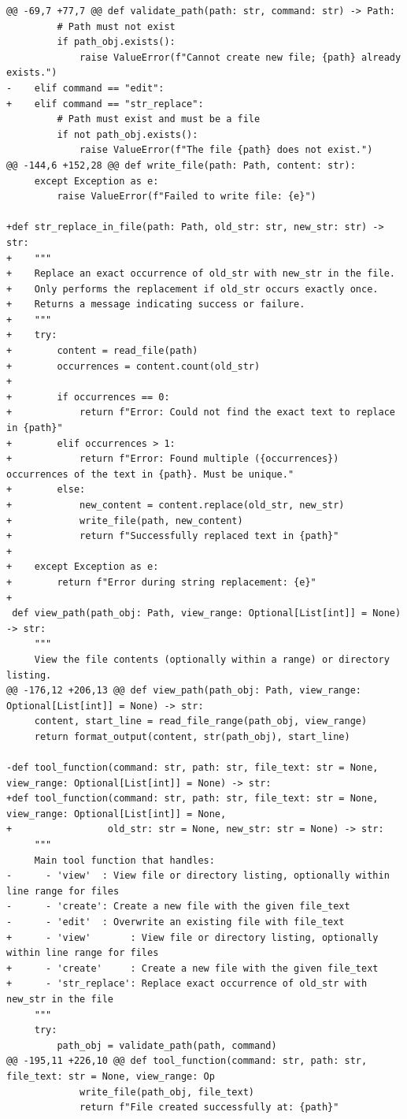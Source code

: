 \documentclass{article} %
\begin{document}
\begin{lstlisting}[style=diffstyle]
@@ -69,7 +77,7 @@ def validate_path(path: str, command: str) -> Path:
         # Path must not exist
         if path_obj.exists():
             raise ValueError(f"Cannot create new file; {path} already exists.")
-    elif command == "edit":
+    elif command == "str_replace":
         # Path must exist and must be a file
         if not path_obj.exists():
             raise ValueError(f"The file {path} does not exist.")
@@ -144,6 +152,28 @@ def write_file(path: Path, content: str):
     except Exception as e:
         raise ValueError(f"Failed to write file: {e}")
 
+def str_replace_in_file(path: Path, old_str: str, new_str: str) -> str:
+    """
+    Replace an exact occurrence of old_str with new_str in the file.
+    Only performs the replacement if old_str occurs exactly once.
+    Returns a message indicating success or failure.
+    """
+    try:
+        content = read_file(path)
+        occurrences = content.count(old_str)
+        
+        if occurrences == 0:
+            return f"Error: Could not find the exact text to replace in {path}"
+        elif occurrences > 1:
+            return f"Error: Found multiple ({occurrences}) occurrences of the text in {path}. Must be unique."
+        else:
+            new_content = content.replace(old_str, new_str)
+            write_file(path, new_content)
+            return f"Successfully replaced text in {path}"
+            
+    except Exception as e:
+        return f"Error during string replacement: {e}"
+
 def view_path(path_obj: Path, view_range: Optional[List[int]] = None) -> str:
     """
     View the file contents (optionally within a range) or directory listing.
@@ -176,12 +206,13 @@ def view_path(path_obj: Path, view_range: Optional[List[int]] = None) -> str:
     content, start_line = read_file_range(path_obj, view_range)
     return format_output(content, str(path_obj), start_line)
 
-def tool_function(command: str, path: str, file_text: str = None, view_range: Optional[List[int]] = None) -> str:
+def tool_function(command: str, path: str, file_text: str = None, view_range: Optional[List[int]] = None,
+                 old_str: str = None, new_str: str = None) -> str:
     """
     Main tool function that handles:
-      - 'view'  : View file or directory listing, optionally within line range for files
-      - 'create': Create a new file with the given file_text
-      - 'edit'  : Overwrite an existing file with file_text
+      - 'view'       : View file or directory listing, optionally within line range for files
+      - 'create'     : Create a new file with the given file_text
+      - 'str_replace': Replace exact occurrence of old_str with new_str in the file
     """
     try:
         path_obj = validate_path(path, command)
@@ -195,11 +226,10 @@ def tool_function(command: str, path: str, file_text: str = None, view_range: Op
             write_file(path_obj, file_text)
             return f"File created successfully at: {path}"
 

\end{lstlisting}
\end{document}
